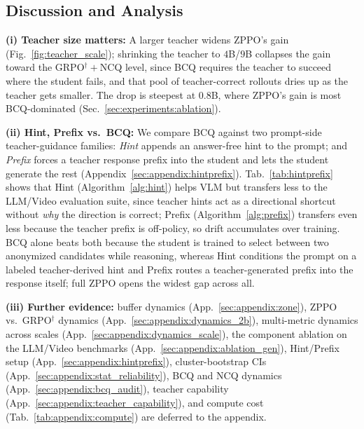 \documentclass{llmxive}
\begin{document}
\subsection{Discussion and Analysis}
\label{sec:experiments:discussion}

\textbf{(i) Teacher size matters:} A larger teacher widens ZPPO's gain (Fig.~\ref{fig:teacher_scale}); shrinking the teacher to $4$B/$9$B collapses the gain toward the GRPO$^{\dagger}\!+\!$NCQ level, since BCQ requires the teacher to succeed where the student fails, and that pool of teacher-correct rollouts dries up as the teacher gets smaller. The drop is steepest at $0.8$B, where ZPPO's gain is most BCQ-dominated (Sec.~\ref{sec:experiments:ablation}).

\textbf{(ii) Hint, Prefix vs.\ BCQ:} We compare BCQ against two prompt-side teacher-guidance families: \emph{Hint} appends an answer-free hint to the prompt; and \emph{Prefix} forces a teacher response prefix into the student and lets the student generate the rest (Appendix~\ref{sec:appendix:hintprefix}). Tab.~\ref{tab:hintprefix} shows that Hint (Algorithm~\ref{alg:hint}) helps VLM but transfers less to the LLM/Video evaluation suite, since teacher hints act as a directional shortcut without \emph{why} the direction is correct; Prefix (Algorithm~\ref{alg:prefix}) transfers even less because the teacher prefix is off-policy, so drift accumulates over training. BCQ alone beats both because the student is trained to select between two anonymized candidates while reasoning, whereas Hint conditions the prompt on a labeled teacher-derived hint and Prefix routes a teacher-generated prefix into the response itself; full ZPPO opens the widest gap across all.

\textbf{(iii) Further evidence:} buffer dynamics (App.~\ref{sec:appendix:zone}), ZPPO vs.\ GRPO$^{\dagger}$ dynamics (App.~\ref{sec:appendix:dynamics_2b}), multi-metric dynamics across scales (App.~\ref{sec:appendix:dynamics_scale}), the component ablation on the LLM/Video benchmarks (App.~\ref{sec:appendix:ablation_gen}), Hint/Prefix setup (App.~\ref{sec:appendix:hintprefix}), cluster-bootstrap CIs (App.~\ref{sec:appendix:stat_reliability}), BCQ and NCQ dynamics (App.~\ref{sec:appendix:bcq_audit}), teacher capability (App.~\ref{sec:appendix:teacher_capability}), and compute cost (Tab.~\ref{tab:appendix:compute}) are deferred to the appendix.
\end{document}
